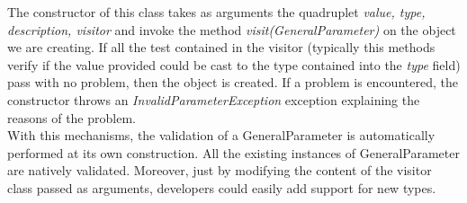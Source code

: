\documentclass[a4paper,11pt] {ivoa}
\begin{document}
The constructor of this class takes as arguments the quadruplet  {\it  value, type, description, visitor} and invoke the method {\it visit(GeneralParameter)} on the object we are creating. If all the test contained in the visitor (typically this methods verify if the value provided could be cast to the type contained into the {\it type} field) pass with no problem, then the object is created. If a problem is encountered, the constructor throws an {\it InvalidParameterException } exception explaining the reasons of the problem.\\

With this mechanisms, the validation of a GeneralParameter is automatically performed at its own construction. All the existing instances of GeneralParameter are natively validated. Moreover, just by modifying the content of the visitor class passed as arguments, developers could easily add support for new types. 
\end{document}
